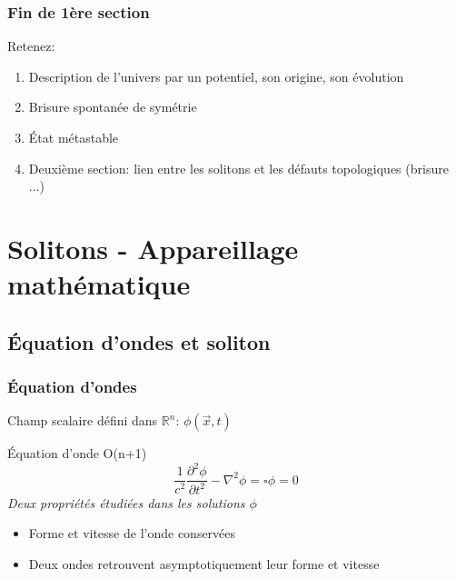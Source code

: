 \documentclass[handout]{beamer}
\begin{document}
  \begin{frame}\frametitle{Fin de 1ère section}
  Retenez:
  \begin{enumerate}
  \item Description de l'univers par un potentiel, son origine, son évolution
  \item Brisure spontanée de symétrie 
  \item État métastable 
  \item Deuxième section: lien entre les solitons et les défauts topologiques (brisure ...)
  \end{enumerate}
%    
  \end{frame}


\section{Solitons - Appareillage mathématique }

\subsection{Équation d'ondes et soliton}
\begin{frame}
\frametitle{Équation d'ondes}
Champ scalaire défini dans $\mathbb{R}^n$: $\phi(\vec{x},t)$\\
\begin{block}{Équation d'onde O(n+1)}
\begin{equation}
\frac{1}{c^2}\frac{\partial^2 \phi}{\partial t^2} - \nabla^2 \phi = \square \phi = 0 
\end{equation}
\textit{Deux propriétés étudiées dans les solutions $\phi$}
\begin{itemize}
\item Forme et vitesse de l'onde conservées\\
\item Deux ondes retrouvent asymptotiquement leur forme et vitesse\\
\end{itemize}
\end{block} 
\end{frame}
\end{document}
